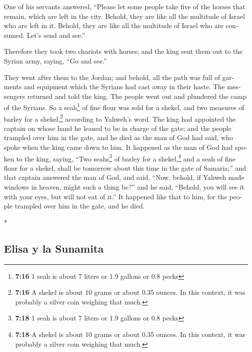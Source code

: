 \begin{paracol}{2}
\begin{otherlanguage}{english}
 One of his servants answered, ``Please let some people
take five of the horses that remain, which are left in the city. Behold,
they are like all the multitude of Israel who are left in it. Behold,
they are like all the multitude of Israel who are consumed. Let's send
and see.''

 Therefore they took two chariots with horses; and the
king sent them out to the Syrian army, saying, ``Go and see.''

 They went after them to the Jordan; and behold, all the
path was full of garments and equipment which the Syrians had cast away
in their haste. The messengers returned and told the king.
 The people went out and plundered the camp of the
Syrians. So a seah\footnote{\textbf{7:16} 1 seah is about 7 liters or
  1.9 gallons or 0.8 pecks} of fine flour was sold for a shekel, and two
measures of barley for a shekel,\footnote{\textbf{7:16} A shekel is
  about 10 grams or about 0.35 ounces. In this context, it was probably
  a silver coin weighing that much.} according to Yahweh's word.
 The king had appointed the captain on whose hand he
leaned to be in charge of the gate; and the people trampled over him in
the gate, and he died as the man of God had said, who spoke when the
king came down to him.  It happened as the man of God had
spoken to the king, saying, ``Two seahs\footnote{\textbf{7:18} 1 seah is
  about 7 liters or 1.9 gallons or 0.8 pecks} of barley for a
shekel,\footnote{\textbf{7:18} A shekel is about 10 grams or about 0.35
  ounces. In this context, it was probably a silver coin weighing that
  much.} and a seah of fine flour for a shekel, shall be tomorrow about
this time in the gate of Samaria;''  and that captain
answered the man of God, and said, ``Now, behold, if Yahweh made windows
in heaven, might such a thing be?'' and he said, ``Behold, you will see
it with your eyes, but will not eat of it.''  It happened
like that to him, for the people trampled over him in the gate, and he
died.

\end{otherlanguage}

\switchcolumn[0]*

\hypertarget{elisa-y-la-sunamita}{%
\subsection{Elisa y la Sunamita}\label{elisa-y-la-sunamita}}


\end{paracol}
